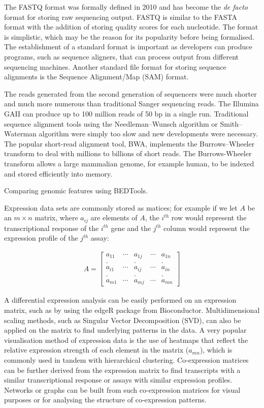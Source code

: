 The FASTQ format was formally defined in 2010\cite{pmid20015970} and has become the \textit{de facto} format for storing raw sequencing output. FASTQ is similar to the FASTA format with the addition of storing quality scores for each nucleotide. The format is simplistic, which may be the reason for its popularity before being formalised. The establishment of a standard format is important as developers can produce programs, such as sequence aligners, that can process output from different sequencing machines. Another standard file format for storing sequence alignments is the Sequence Alignment/Map (SAM) format\cite{pmid19505943}.

The reads generated from the second generation of sequencers were much shorter and much more numerous than traditional Sanger sequencing reads. The Illumina GAII can produce up to 100 million reads of 50 bp in a single run. Traditional sequence alignment tools using the Needleman–Wunsch algorithm or Smith–Waterman algorithm were simply too slow and new developments were necessary. The popular short-read alignment tool, BWA\cite{pmid19451168}, implements the Burrows–Wheeler transform to deal with millions to billions of short reads. The Burrows-Wheeler transform allows a large mammalian genome, for example human, to be indexed and stored efficiently into memory\cite{pmid19430453}.

Comparing genomic features using BEDTools\cite{pmid20110278}.

Expression data sets are commonly stored as matices; for example if we let $A$ be an $m \times n$ matrix, where $a_{ij}$ are elements of $A$, the $i^{th}$ row would represent the transcriptional response of the $i^{th}$ gene and the $j^{th}$ column would represent the expression profile of the $j^{th}$ assay:

\begin{align*}
   A = \begin{bmatrix} a_{11} & \cdots & a_{1j} & \cdots & a_{1n} \\
   . && . && . \\
   a_{i1} & \cdots & a_{ij} & \cdots & a_{in} \\
   . && . && . \\
   a_{m1} & \cdots & a_{mj} & \cdots & a_{mn} \end{bmatrix}
\end{align*}

A differential expression analysis can be easily performed on an expression matrix, such as by using the edgeR package\cite{pmid19910308} from Bioconductor\cite{pmid15461798}. Multidimensional scaling methods, such as Singular Vector Decomposition (SVD), can also be applied on the matrix to find underlying patterns in the data. A very popular visualisation method of expression data is the use of heatmaps that reflect the relative expression strength of each element in the matrix ($a_{mn}$), which is commonly used in tandem with hierarchical clustering. Co-expression matrices can be further derived from the expression matrix to find transcripts with a similar transcriptional response or assays with similar expression profiles. Networks or graphs can be built from such co-expression matrices for visual purposes or for analysing the structure of co-expression patterns.

